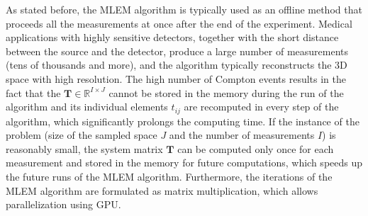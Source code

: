As stated before, the \ac{MLEM} algorithm is typically used as an offline method that proceeds all the measurements at once after the end of the experiment.
Medical applications with highly sensitive detectors, together with the short distance between the source and the detector, produce a large number of measurements (tens of thousands and more), and the algorithm typically reconstructs the 3D space with high resolution.
The high number of Compton events results in the fact that the $\mathbf{T}\in \mathbb{R}^{I \times J}$ cannot be stored in the memory during the run of the algorithm and its individual elements $t_{ij}$ are recomputed in every step of the algorithm, which significantly prolongs the computing time.
If the instance of the problem (size of the sampled space $J$ and the number of measurements $I$) is reasonably small, the system matrix $\mathbf{T}$ can be computed only once for each measurement and stored in the memory for future computations, which speeds up the future runs of the \ac{MLEM} algorithm.
Furthermore, the iterations of the \ac{MLEM} algorithm are formulated as matrix multiplication, which allows parallelization using \ac{GPU}.

